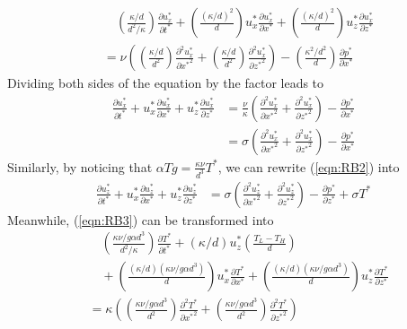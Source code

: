 \begin{align*}
&\quad \left(\frac{\kappa/d}{d^2/\kappa}\right)\frac{\partial u_x^*}{\partial t^*} + \left(\frac{(\kappa/d)^2}{d}\right)u_x^*\frac{\partial u_x^*}{\partial x^*} + \left(\frac{(\kappa/d)^2}{d}\right)u_z^* \frac{\partial u_x^*}{\partial z^*} \\
&= \nu\left(\left(\frac{\kappa/d}{d^2}\right)\frac{\partial^2 u_x^*}{\partial {x^*}^2} + \left(\frac{\kappa/d}{d^2}\right)\frac{\partial^2 u_x^*}{\partial {z^*}^2}\right) - \left(\frac{\kappa^2/d^2}{d}\right)\frac{\partial p^*}{\partial x^*}    
\end{align*}
Dividing both sides of the equation by the factor  leads to
\begin{align}
\frac{\partial u_x^*}{\partial t^*} + u_x^*\frac{\partial u_x^*}{\partial x^*} + u_z^* \frac{\partial u_x^*}{\partial z^*} 
&= \frac{\nu}{\kappa}\left(\frac{\partial^2 u_x^*}{\partial {x^*}^2} + \frac{\partial^2 u_x^*}{\partial {z^*}^2}\right) - \frac{\partial p^*}{\partial x^*} \nonumber \\
&= \sigma\left(\frac{\partial^2 u_x^*}{\partial {x^*}^2} + \frac{\partial^2 u_x^*}{\partial {z^*}^2}\right) - \frac{\partial p^*}{\partial x^*} \label{eqn:RB1n}
\end{align}
Similarly, by noticing that $\alpha T g = \frac{\kappa\nu}{d^3} T^*$, we can rewrite (\ref{eqn:RB2}) into
\begin{align}
\frac{\partial u_z^*}{\partial t^*} + u_x^*\frac{\partial u_z^*}{\partial x^*} + u_z^* \frac{\partial u_z^*}{\partial z^*} &= \sigma\left(\frac{\partial^2 u_z^*}{\partial {x^*}^2} + \frac{\partial^2 u_z^*}{\partial {z^*}^2}\right) - \frac{\partial p^*}{\partial z^*} + \sigma T^* \label{eqn:RB2n}
\end{align}
Meanwhile, (\ref{eqn:RB3}) can be transformed into
\begin{align*}
&\quad \left(\frac{\kappa\nu/g\alpha d^3}{d^2/\kappa}\right)\frac{\partial T^*}{\partial t^*} + (\kappa/d)u_z^* \left(\frac{T_L - T_H}{d}\right) \\
&\quad + \left(\frac{(\kappa/d)(\kappa\nu/g\alpha d^3)}{d}\right)u_x^*\frac{\partial T^*}{\partial x^*} + \left(\frac{(\kappa/d)(\kappa\nu/g\alpha d^3)}{d}\right)u_z^*\frac{\partial T^*}{\partial z^*} \\
&= \kappa \left(\left(\frac{\kappa\nu/g\alpha d^3}{d^2}\right)\frac{\partial^2 T^*}{\partial {x^*}^2} + \left(\frac{\kappa\nu/g\alpha d^3}{d^2}\right)\frac{\partial^2 T^*}{\partial {z^*}^2}\right)  
\end{align*}
